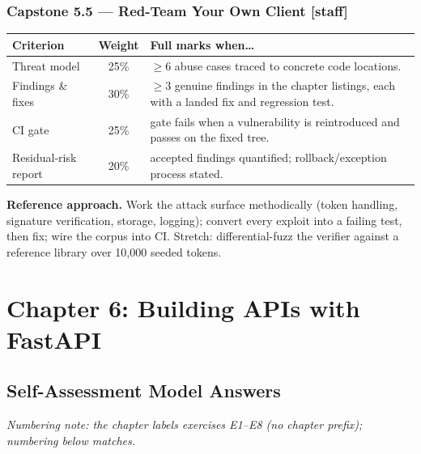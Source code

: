 \subsubsection*{Capstone 5.5 --- Red-Team Your Own Client [staff]}
\begin{center}\small
\begin{tabularx}{\textwidth}{l c X}
\toprule
\textbf{Criterion} & \textbf{Weight} & \textbf{Full marks when\ldots} \\
\midrule
Threat model & 25\% & $\geq$6 abuse cases traced to concrete code locations. \\
Findings \& fixes & 30\% & $\geq$3 genuine findings in the chapter listings, each with a landed fix and regression test. \\
CI gate & 25\% & gate fails when a vulnerability is reintroduced and passes on the fixed tree. \\
Residual-risk report & 20\% & accepted findings quantified; rollback/exception process stated. \\
\bottomrule
\end{tabularx}
\end{center}
\textbf{Reference approach.} Work the attack surface methodically (token
handling, signature verification, storage, logging); convert every exploit
into a failing test, then fix; wire the corpus into CI. Stretch:
differential-fuzz the verifier against a reference library over 10{,}000
seeded tokens.

\section{Chapter 6: Building APIs with FastAPI}
\label{sec:sol-ch6}

\subsection{Self-Assessment Model Answers}

\emph{Numbering note: the chapter labels exercises E1--E8 (no chapter
prefix); numbering below matches.}

